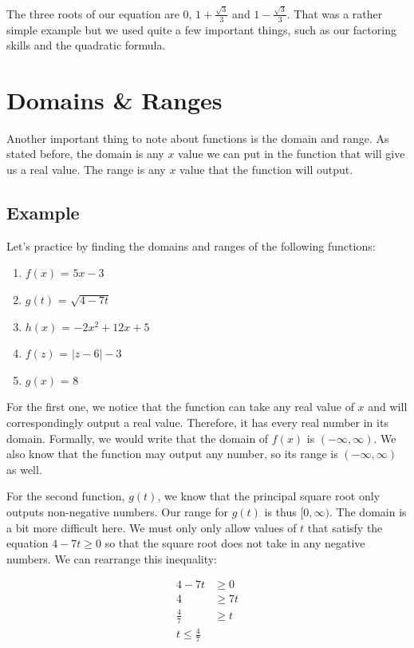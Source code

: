 \documentclass[12pt]{article}
\begin{document}
The three roots of our equation are $0$, $1 + \frac{\sqrt{3}}{3}$ and $1 - \frac{\sqrt{3}}{3}$.
That was a rather simple example but we used quite a few important things, such as our factoring skills and the quadratic formula.

\section{Domains \& Ranges}
Another important thing to note about functions is the domain and range.
As stated before, the domain is any $x$ value we can put in the function that will give us a real value.
The range is any $x$ value that the function will output.

\subsection{Example}
Let's practice by finding the domains and ranges of the following functions:

\begin{enumerate}
    \item $f(x)$ = $5x-3$
    \item $g(t)$ = $\sqrt{4-7t}$
    \item $h(x)$ = $-2x^2+12x+5$
    \item $f(z)$ = $|z-6|-3$
    \item $g(x)$ = $8$
\end{enumerate}

For the first one, we notice that the function can take any real value of $x$ and will correspondingly output a real value.
Therefore, it has every real number in its domain. Formally, we would write that the domain of $f(x)$ is $(-\infty , \infty)$.
We also know that the function may output any number, so its range is $(-\infty , \infty)$ as well.

For the second function, $g(t)$, we know that the principal square root only outputs non-negative numbers.
Our range for $g(t)$ is thus $[0, \infty)$.
                The domain is a bit more difficult here.
                We must only only allow values of $t$ that satisfy the equation $4-7t\geq0$ so that the square root does not take in any negative numbers.
                We can rearrange this inequality:

                \begin{align}
                    4-7t        & \geq 0  \\
                    4           & \geq 7t \\
                    \frac{4}{7} & \geq t  \\
                    t \leq \frac{4}{7}
                \end{align}
\end{document}
